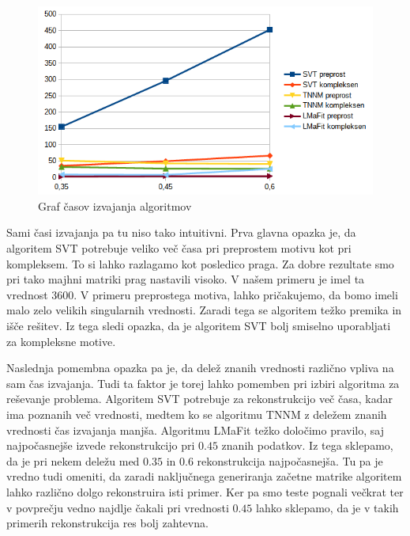\begin{figure}[!ht]
    \centering
    \includegraphics[width=\linewidth]{Poglavja/Slike/kompleksnost/kompleksna grayscale 300/cas.png}
    \caption{Graf časov izvajanja algoritmov}
\end{figure}
Sami časi izvajanja pa tu niso tako intuitivni. Prva glavna opazka je, da algoritem SVT potrebuje veliko več časa pri preprostem motivu kot pri kompleksem.  To si lahko razlagamo kot posledico praga. Za dobre rezultate smo pri tako majhni matriki prag nastavili visoko. V našem primeru je imel ta vrednost $3600$. V primeru preprostega motiva, lahko pričakujemo, da bomo imeli malo zelo velikih singularnih vrednosti. Zaradi tega se algoritem težko premika in išče rešitev. Iz tega sledi opazka, da je algoritem SVT bolj smiselno uporabljati za kompleksne motive.

Naslednja pomembna opazka pa je, da delež znanih vrednosti različno vpliva na sam čas izvajanja. Tudi ta faktor je torej lahko pomemben pri izbiri algoritma za reševanje problema. Algoritem SVT potrebuje za rekonstrukcijo več časa, kadar ima poznanih več vrednosti, medtem ko se algoritmu TNNM z deležem znanih vrednosti čas izvajanja manjša. Algoritmu LMaFit težko določimo pravilo, saj najpočasnejše izvede rekonstrukcijo pri $0.45$ znanih podatkov. Iz tega sklepamo, da je pri nekem deležu med $0.35$ in $0.6$ rekonstrukcija najpočasnejša. Tu pa je vredno tudi omeniti, da zaradi naključnega generiranja začetne matrike algoritem lahko različno dolgo rekonstruira isti primer.  Ker pa smo teste pognali večkrat ter v povprečju vedno najdlje čakali pri vrednosti $0.45$ lahko sklepamo, da je v takih primerih rekonstrukcija res bolj zahtevna.

